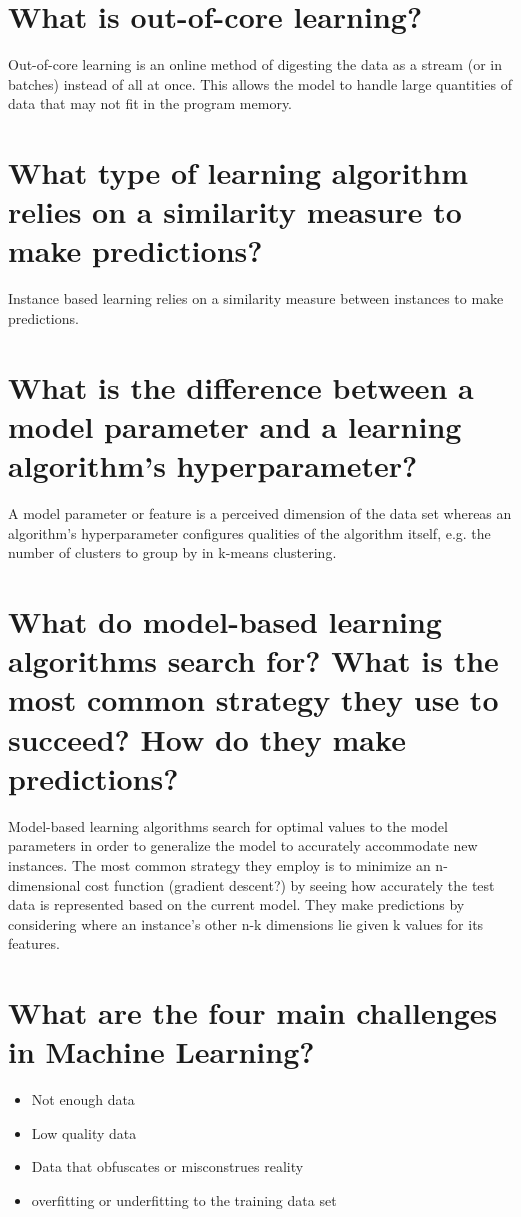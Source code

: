 \documentclass[letterpaper,12pt]{article}
\begin{document}
	\section{What is out-of-core learning?}
	Out-of-core learning is an online method of digesting the data as a stream (or in batches) instead of all at once. This allows the model to handle large quantities of data that may not fit in the program memory.
	
	\section{What type of learning algorithm relies on a similarity measure to make predictions?}
	Instance based learning relies on a similarity measure between instances to make predictions.
	
	\section{What is the difference between a model parameter and a learning algorithm's hyperparameter?}
	A model parameter or feature is a perceived dimension of the data set whereas an algorithm's hyperparameter configures qualities of the algorithm itself, e.g. the number of clusters to group by in k-means clustering.
	
	\section{What do model-based learning algorithms search for? What is the most common strategy they use to succeed? How do they make predictions?}
	Model-based learning algorithms search for optimal values to the model parameters in order to generalize the model to accurately accommodate new instances. The most common strategy they employ is to minimize an n-dimensional cost function (gradient descent?) by seeing how accurately the test data is represented based on the current model. They make predictions by considering where an instance's other n-k dimensions lie given k values for its features.
	
	\section{What are the four main challenges in Machine Learning?}
	\begin{itemize}[leftmargin=*]
		\item Not enough data
		\item Low quality data
		\item Data that obfuscates or misconstrues reality
		\item overfitting or underfitting to the training data set
	\end{itemize}
\end{document}
